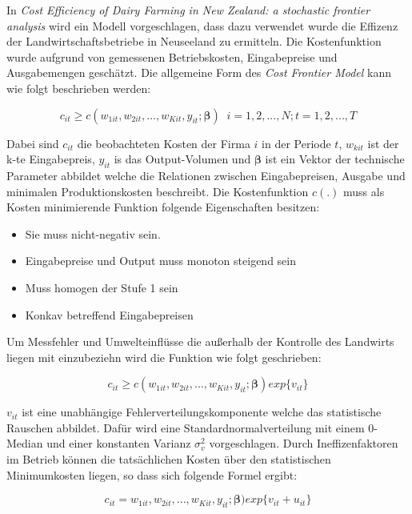 In \textit{Cost Efficiency of Dairy Farming in New Zealand: a stochastic frontier analysis}\cite{conf:Jian2013} wird ein Modell vorgeschlagen, dass dazu verwendet wurde die Effizenz der Landwirtschaftsbetriebe in Neuseeland zu ermitteln. Die Kostenfunktion wurde aufgrund von gemessenen Betriebskosten, Eingabepreise und Ausgabemengen geschätzt. Die allgemeine Form des \textit{Cost Frontier Model} kann wie folgt beschrieben werden:

\begin{equation}
	c_{it} \geq c(w_{1it}, w_{2it},...,w_{Kit},y_{it};\boldsymbol{\beta}) \;\; i=1,2,...,N;t=1,2,...,T
\end{equation}

Dabei sind $c_{it}$ die beobachteten Kosten der Firma $i$ in der Periode $t$, $w_{kit}$ ist der k-te Eingabepreis, $y_{it}$ is das Output-Volumen und $\boldsymbol{\beta}$ ist ein Vektor der technische Parameter abbildet welche die Relationen zwischen Eingabepreisen, Ausgabe und minimalen Produktionskosten beschreibt. Die Kostenfunktion $c(.)$ muss als Kosten minimierende Funktion folgende Eigenschaften besitzen:
\begin{itemize}
	\item Sie muss nicht-negativ sein.
	\item Eingabepreise und Output muss monoton steigend sein
	\item Muss homogen der Stufe 1 sein
	\item Konkav betreffend Eingabepreisen
\end{itemize}

Um Messfehler und Umwelteinflüsse die außerhalb der Kontrolle des Landwirts liegen mit einzubeziehn wird die Funktion wie folgt geschrieben:

\begin{equation}
	c_{it} \geq c(w_{1it},w_{2it},...,w_{Kit},y_{it};\boldsymbol{\beta})exp\{v_{it}\}
\end{equation}

$v_{it}$ ist eine unabhängige Fehlerverteilungskomponente welche das statistische Rauschen abbildet. Dafür wird eine Standardnormalverteilung mit einem 0-Median und einer konstanten Varianz $\sigma_{v}^2$ vorgeschlagen. Durch Ineffizenfaktoren im Betrieb können die tatsächlichen Kosten über den statistischen Minimumkosten liegen, so dass sich folgende Formel ergibt:

\begin{equation}
	c_{it} = w_{1it},w_{2it},...,w_{Kit},y_{it};\boldsymbol{\beta})exp\{v_{it} + u_{it}\}
\end{equation}

